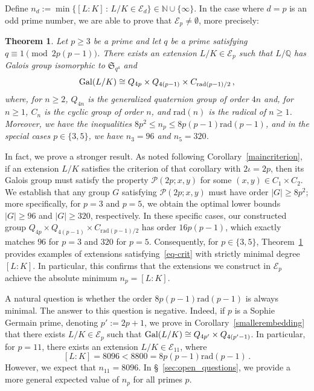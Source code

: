 \documentclass[12pt]{amsart}
\numberwithin{equation}{section}
\newcommand{\Gal}{{\rm Gal}}
\newcommand{\Q}{\mathbb Q}
\newcommand{\N}{\mathbb N}
\newtheorem{thm}[X]{Theorem}
\newtheorem{conjecture}[X]{Conjecture}
\theoremstyle{definition}
\theoremstyle{remark}
\begin{document}
Define \(n_d:=\min \{[L:K]\, \colon\,  L/K\in \mathcal{E}_d\}\in \N\cup\{\infty\} \). In the case where $d=p$ is an odd prime number, we are able to prove that $\mathcal{E}_p\ne \emptyset$, more precisely: 
\begin{thm}\label{np}
    Let $p\ge 3$ be a prime and let $q$ be a prime satisfying $q\equiv 1\pmod{2p(p-1)}$. There exists an extension $L/K\in \mathcal{E}_p$ such that $L/\Q$ has Galois group isomorphic to $\mathfrak{S}_{q^4}$ and 
    \[ \Gal(L/K)\cong Q_{4p} \times Q_{4(p-1)} \times C_{\mathrm{rad}(p-1)/2} \, ,\]
    where, for $n\ge2$, $Q_{4n}$ is the generalized quaternion group of order $4n$ and, for $n\ge 1$, $C_n$ is the cyclic group of order $n$, and $\mathrm{rad}(n)$ is the radical of $n\ge1$. 
    Moreover, we have the inequalities $8p^2\le n_p\le 8p(p-1)\mathrm{rad}(p-1)$, and in the special cases $p\in\{3,5\}$, we have $n_3=96$ and $n_5=320$.
\end{thm}
In fact, we prove a stronger result. As noted following Corollary~\ref{maincriterion}, if an extension $L/K$ satisfies the criterion of that corollary with $2\iota=2p$, then its Galois group must satisfy the property $\mathcal{P}(2p;x,y)$ for some $(x,y)\in C_1\times C_2$. We establish that any group $G$ satisfying $\mathcal{P}(2p;x,y)$ must have order $|G|\ge 8p^2$; more specifically, for $p=3$ and $p=5$, we obtain the optimal lower bounds $|G|\ge 96$ and $|G|\ge 320$, respectively. In these specific cases, our constructed group $Q_{4p}\times Q_{4(p-1)}\times C_{\mathrm{rad}(p-1)/2}$ has order $16p(p-1)$, which exactly matches $96$ for $p=3$ and $320$ for $p=5$. Consequently, for $p\in \{3,5\}$, Theorem~\ref{np} provides examples of extensions satisfying~\eqref{eq-crit} with strictly minimal degree $[L:K]$. In particular, this confirms that the extensions we construct in $\mathcal{E}_p$ achieve the absolute minimum $n_p=[L:K]$. 

A natural question is whether the order $8p(p-1)\mathrm{rad}(p-1)$ is always minimal. The answer to this question is negative. Indeed, if $p$ is a Sophie Germain prime, denoting $p':=2p+1$, we prove in Corollary~\ref{smallerembedding} that there exists $L/K\in \mathcal{E}_p$ such that $\Gal(L/K)\cong Q_{4p'}\times Q_{4(p'-1)}$. In particular, for $p=11$, there exists an extension $L/K\in \mathcal{E}_{11}$, where \[[L:K]=8096<8800=8p(p-1)\mathrm{rad}(p-1)\, .\]
However, we expect that $n_{11}=8096$. In \S~\ref{sec:open_questions}, we provide a more general expected value of $n_p$ for all primes $p$. 
\end{document}

